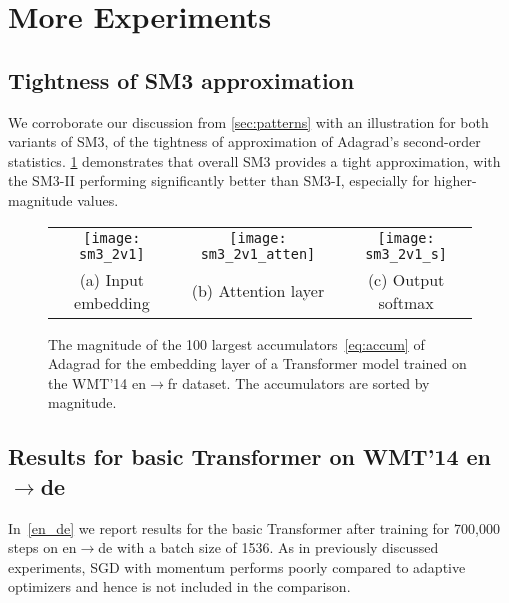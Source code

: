 \documentclass[a4paper,11pt]{article}
\def\NAME{SM3\xspace}
\newcommand{\entode}{en$\to$de\xspace}
\newcommand{\entofr}{en$\to$fr\xspace}
\begin{document}
\section{More Experiments}
\label{sec:more-exper}

\subsection{Tightness of \NAME approximation}

We corroborate our discussion from \cref{sec:patterns} with an illustration
for both variants of \NAME, of the tightness of approximation of Adagrad's
second-order statistics. \cref{fig:sm3_2v1} demonstrates that overall \NAME
provides a tight approximation, with the \NAME-II performing significantly
better than \NAME-I, especially for higher-magnitude values.


\begin{figure}[h!]
  \centering
  \begin{tabular}{ccc}
    \texttt{[image: sm3\_2v1]} &
    \texttt{[image: sm3\_2v1\_atten]} &
    \texttt{[image: sm3\_2v1\_s]}  \\
    {\small(a) Input embedding} & {\small (b) Attention layer} & {\small (c) Output softmax}
  \end{tabular}
\caption{The magnitude of the 100 largest accumulators~\cref{eq:accum} of
	Adagrad for the embedding layer of a Transformer model trained
  on the WMT'14 \entofr dataset. The accumulators are sorted by magnitude.}
\label{fig:sm3_2v1}
\end{figure}


\subsection{Results for basic Transformer on WMT'14 \entode}

In~\cref{en_de} we report results for the basic Transformer after training for
700,000 steps on \entode with a batch size of 1536.  As in previously
discussed experiments, SGD with momentum performs poorly compared to adaptive
optimizers and hence is not included in the comparison.
\end{document}
